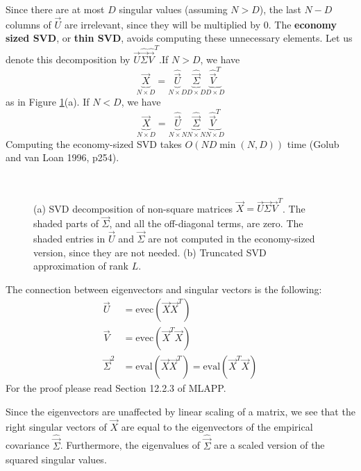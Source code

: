 Since there are at most $D$ singular values (assuming $N>D$), the last $N−D$ columns of $\vec{U}$ are irrelevant, since they will be multiplied by 0. The \textbf{economy sized SVD}, or \textbf{thin SVD}, avoids computing these unnecessary elements. Let us denote this decomposition by $\hat{\vec{U}}\hat{\vec{\Sigma}}\hat{\vec{V}}^T$.If $N>D$, we have
\begin{equation}
\underbrace{\vec{X}}_{N \times D}=\underbrace{\hat{\vec{U}}}_{N \times D}\underbrace{\hat{\vec{\Sigma}}}_{D \times D}\underbrace{\hat{\vec{V}}^T}_{D \times D}
\end{equation}
as in Figure \ref{fig:SVD}(a). If $N<D$, we have
\begin{equation}
\underbrace{\vec{X}}_{N \times D}=\underbrace{\hat{\vec{U}}}_{N \times N}\underbrace{\hat{\vec{\Sigma}}}_{N \times N}\underbrace{\hat{\vec{V}}^T}_{N \times D}
\end{equation}
Computing the economy-sized SVD takes $O(ND\min(N,D))$ time (Golub and van Loan 1996, p254).

\begin{figure}[hbtp]
\centering
{} \\
\caption{(a) SVD decomposition of non-square matrices $\vec{X}=\vec{U}\vec{\Sigma}\vec{V}^T$. The shaded parts of $\vec{\Sigma}$, and all the off-diagonal terms, are zero. The shaded entries in $\vec{U}$ and $\vec{\Sigma}$ are not computed in the economy-sized version, since they are not needed. (b) Truncated SVD approximation of rank $L$.}
\label{fig:SVD} 
\end{figure}

The connection between eigenvectors and singular vectors is the following:
\begin{align}
\vec{U}&=\mathrm{evec}(\vec{X}\vec{X}^T) \\
\vec{V}&=\mathrm{evec}(\vec{X}^T\vec{X}) \\
\vec{\Sigma}^2&=\mathrm{eval}(\vec{X}\vec{X}^T)=\mathrm{eval}(\vec{X}^T\vec{X})
\end{align}
For the proof please read Section 12.2.3 of MLAPP.

Since the eigenvectors are unaffected by linear scaling of a matrix, we see that the right singular vectors of $\vec{X}$ are equal to the eigenvectors of the empirical covariance $\hat{\vec{\Sigma}}$. Furthermore, the eigenvalues of $\hat{\vec{\Sigma}}$ are a scaled version of the squared singular values.

